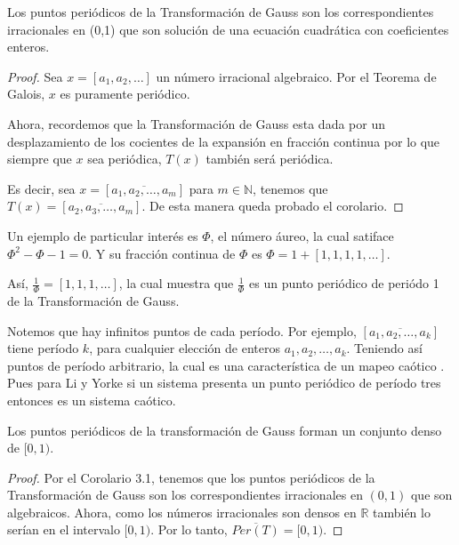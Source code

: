 \begin{cor}
Los puntos periódicos de la Transformación de Gauss son los correspondientes irracionales en (0,1) que son solución de una ecuación cuadrática con coeficientes enteros.
\end{cor}
\begin{proof}
Sea $x=[a_{1},a_{2},\ldots]$ un número irracional algebraico. Por el Teorema de Galois, $x$ es puramente periódico.

Ahora, recordemos que la Transformación de Gauss esta dada por un desplazamiento de los cocientes de la expansión en fracción continua por lo que siempre que $x$ sea periódica, $T(x)$ también será periódica.

Es decir, sea $x=[\overline{a_{1},a_{2},\ldots,a_{m}}]$ para $m\in\mathbb{N}$, tenemos que $T(x)=[\overline{a_{2},a_{3},\ldots,a_{m}}]$.
De esta manera queda probado el corolario.
\end{proof}

\begin{ejem}
Un ejemplo de particular interés es $\Phi$, el número áureo, la cual satiface $\Phi^{2}-\Phi-1=0$. Y su fracción continua de $\Phi$ es $\Phi=1+[1,1,1,1,\ldots]$.

Así, $\frac{1}{\Phi}=[1,1,1,\ldots]$, la cual muestra que $\frac{1}{\Phi}$ es un punto periódico de periódo 1 de la Transformación de Gauss.
\end{ejem}

Notemos que hay infinitos puntos de cada período. Por ejemplo, $[\overline{a_{1},a_{2},\ldots,a_{k}}]$ tiene período $k$, para cualquier elección de enteros $a_{1},a_{2},\ldots,a_{k}$. Teniendo así puntos de período arbitrario, la cual es una característica de un mapeo caótico \cite{TYJY1975}. Pues para Li y Yorke si un sistema presenta un punto periódico de período tres entonces es un sistema caótico.


\begin{cor}
Los puntos periódicos de la transformación de Gauss forman un conjunto denso de $[0,1)$.
\end{cor}
\begin{proof}
Por el Corolario 3.1, tenemos que los puntos periódicos de la Transformación de Gauss son los correspondientes irracionales en $(0,1)$ que son algebraicos. Ahora, como los números irracionales son densos en $\mathbb{R}$ también lo serían en el intervalo $[0,1)$. Por lo tanto, $\overline{Per(T)}=[0,1)$.
\end{proof}

